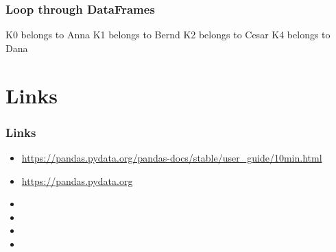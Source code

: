 \documentclass[ngerman]{beamer}
\begin{document}
\begin{frame}[containsverbatim]
\frametitle{Loop through DataFrames}



\begin{ausgabe}
K0 belongs to Anna
K1 belongs to Bernd
K2 belongs to Cesar
K4 belongs to Dana
\end{ausgabe}
\end{frame}

\section{Links}


\begin{frame}
\frametitle{Links}

\begin{itemize}
	\item \url{https://pandas.pydata.org/pandas-docs/stable/user_guide/10min.html}
	\item \url{https://pandas.pydata.org}
	\item 
	\item 
	\item 
	\item 
\end{itemize}



\end{frame}
\end{document}
